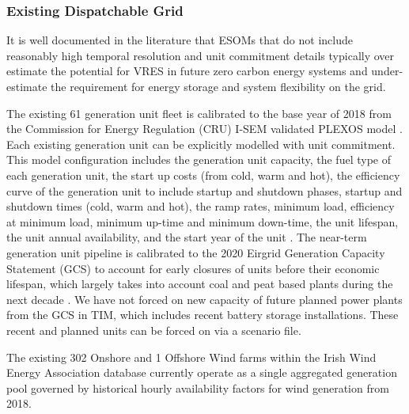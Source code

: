 \documentclass[gmd,manuscript]{copernicus}
\begin{document}
\subsubsection{Existing Dispatchable Grid}
It is well documented in the literature that ESOMs that do not include reasonably high temporal resolution and unit commitment details typically over estimate the potential for VRES in future zero carbon energy systems and under-estimate the requirement for energy storage and system flexibility on the grid.

The existing 61 generation unit fleet is calibrated to the base year of 2018 from the Commission for Energy Regulation (CRU) I-SEM validated PLEXOS model \citep{Geffert2018}. Each existing generation unit can be explicitly modelled with unit commitment. This model configuration includes the generation unit capacity, the fuel type of each generation unit, the start up costs (from cold, warm and hot), the efficiency curve of the generation unit to include startup and shutdown phases, startup and shutdown times (cold, warm and hot), the ramp rates, minimum load, efficiency at minimum load, minimum up-time and minimum down-time, the unit lifespan, the unit annual availability, and the start year of the unit \citep{Geffert2018}. The near-term generation unit pipeline is calibrated to the 2020 Eirgrid Generation Capacity Statement (GCS) to account for early closures of units before their economic lifespan, which largely takes into account coal and peat based plants during the next decade \citep{EirGridadSONI2019}. We have not forced on new capacity of future planned power plants from the GCS in TIM, which includes recent battery storage installations. These recent and planned units can be forced on via a scenario file. 

The existing 302 Onshore and 1 Offshore Wind farms within the Irish Wind Energy Association database currently operate as a single aggregated generation pool governed by historical hourly availability factors for wind generation from 2018.
\end{document}
